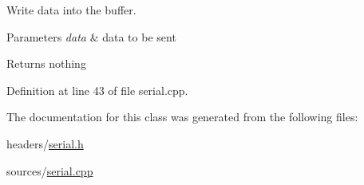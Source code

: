 Write data into the buffer. 


\begin{DoxyParams}{Parameters}
{\em data} & data to be sent \\
\hline
\end{DoxyParams}
\begin{DoxyReturn}{Returns}
nothing 
\end{DoxyReturn}


Definition at line 43 of file serial.\-cpp.



The documentation for this class was generated from the following files\-:\begin{DoxyCompactItemize}
\item 
headers/\hyperlink{serial_8h}{serial.\-h}\item 
sources/\hyperlink{serial_8cpp}{serial.\-cpp}\end{DoxyCompactItemize}
